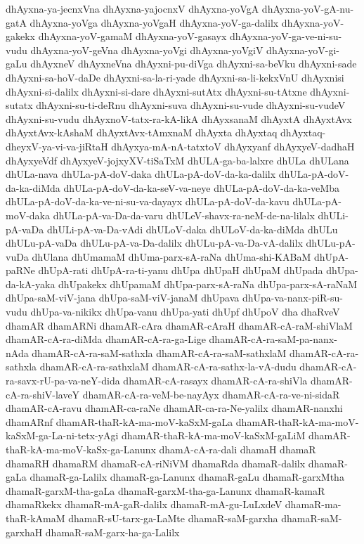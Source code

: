 {dhAyxna-ya-jecnxVna
dhAyxna-yajocnxV
dhAyxna-yoVgA
dhAyxna-yoV-gA-nu-gatA
dhAyxna-yoVga
dhAyxna-yoVgaH
dhAyxna-yoV-ga-dalilx
dhAyxna-yoV-gakekx
dhAyxna-yoV-gamaM
dhAyxna-yoV-gasayx
dhAyxna-yoV-ga-ve-ni-su-vudu
dhAyxna-yoV-geVna
dhAyxna-yoVgi
dhAyxna-yoVgiV
dhAyxna-yoV-gi-gaLu
dhAyxneV
dhAyxneVna
dhAyxni-pu-diVga
dhAyxni-sa-beVku
dhAyxni-sade
dhAyxni-sa-hoV-daDe
dhAyxni-sa-la-ri-yade
dhAyxni-sa-li-kekxVnU
dhAyxnisi
dhAyxni-si-dalilx
dhAyxni-si-dare
dhAyxni-sutAtx
dhAyxni-su-tAtxne
dhAyxni-sutatx
dhAyxni-su-ti-deRnu
dhAyxni-suva
dhAyxni-su-vude
dhAyxni-su-vudeV
dhAyxni-su-vudu
dhAyxnoV-tatx-ra-kA-likA
dhAyxsanaM
dhAyxtA
dhAyxtAvx
dhAyxtAvx-kAshaM
dhAyxtAvx-tAmxnaM
dhAyxta
dhAyxtaq
dhAyxtaq-dheyxV-ya-vi-va-jiRtaH
dhAyxya-mA-nA-tatxtoV
dhAyxyanf
dhAyxyeV-dadhaH
dhAyxyeVdf
dhAyxyeV-jojxyXV-tiSaTxM
dhULA-ga-ba-lalxre
dhULa
dhULana
dhULa-nava
dhULa-pA-doV-daka
dhULa-pA-doV-da-ka-dalilx
dhULa-pA-doV-da-ka-diMda
dhULa-pA-doV-da-ka-seV-va-neye
dhULa-pA-doV-da-ka-veMba
dhULa-pA-doV-da-ka-ve-ni-su-va-dayayx
dhULa-pA-doV-da-kavu
dhULa-pA-moV-daka
dhULa-pA-va-Da-da-varu
dhULeV-shavx-ra-neM-de-na-lilalx
dhULi-pA-vaDa
dhULi-pA-va-Da-vAdi
dhULoV-daka
dhULoV-da-ka-diMda
dhULu
dhULu-pA-vaDa
dhULu-pA-va-Da-dalilx
dhULu-pA-va-Da-vA-dalilx
dhULu-pA-vuDa
dhUlana
dhUmamaM
dhUma-parx-sA-raNa
dhUma-shi-KABaM
dhUpA-paRNe
dhUpA-rati
dhUpA-ra-ti-yanu
dhUpa
dhUpaH
dhUpaM
dhUpada
dhUpa-da-kA-yaka
dhUpakekx
dhUpamaM
dhUpa-parx-sA-raNa
dhUpa-parx-sA-raNaM
dhUpa-saM-viV-jana
dhUpa-saM-viV-janaM
dhUpava
dhUpa-va-nanx-piR-su-vudu
dhUpa-va-nikikx
dhUpa-vanu
dhUpa-yati
dhUpf
dhUpoV
dha
dhaRveV
dhamAR
dhamARNi
dhamAR-cAra
dhamAR-cAraH
dhamAR-cA-raM-shiVlaM
dhamAR-cA-ra-diMda
dhamAR-cA-ra-ga-Lige
dhamAR-cA-ra-saM-pa-nanx-nAda
dhamAR-cA-ra-saM-sathxla
dhamAR-cA-ra-saM-sathxlaM
dhamAR-cA-ra-sathxla
dhamAR-cA-ra-sathxlaM
dhamAR-cA-ra-sathx-la-vA-dudu
dhamAR-cA-ra-savx-rU-pa-va-neY-dida
dhamAR-cA-rasayx
dhamAR-cA-ra-shiVla
dhamAR-cA-ra-shiV-laveY
dhamAR-cA-ra-veM-be-nayAyx
dhamAR-cA-ra-ve-ni-sidaR
dhamAR-cA-ravu
dhamAR-ca-raNe
dhamAR-ca-ra-Ne-yalilx
dhamAR-nanxhi
dhamARnf
dhamAR-thaR-kA-ma-moV-kaSxM-gaLa
dhamAR-thaR-kA-ma-moV-kaSxM-ga-La-ni-tetx-yAgi
dhamAR-thaR-kA-ma-moV-kaSxM-gaLiM
dhamAR-thaR-kA-ma-moV-kaSx-ga-Lanunx
dhamA-cA-ra-dali
dhamaH
dhamaR
dhamaRH
dhamaRM
dhamaR-cA-riNiVM
dhamaRda
dhamaR-dalilx
dhamaR-gaLa
dhamaR-ga-Lalilx
dhamaR-ga-Lanunx
dhamaR-gaLu
dhamaR-garxMtha
dhamaR-garxM-tha-gaLa
dhamaR-garxM-tha-ga-Lanunx
dhamaR-kamaR
dhamaRkekx
dhamaR-mA-gaR-dalilx
dhamaR-mA-gu-LuLxdeV
dhamaR-ma-thaR-kAmaM
dhamaR-sU-tarx-ga-LaMte
dhamaR-saM-garxha
dhamaR-saM-garxhaH
dhamaR-saM-garx-ha-ga-Lalilx
}
